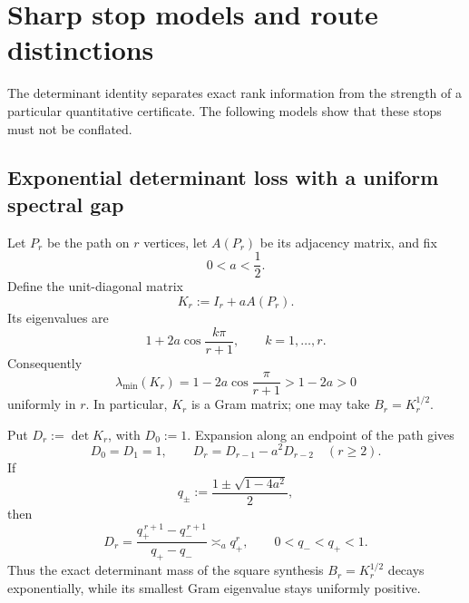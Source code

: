 \section{Sharp stop models and route distinctions}
\label{sec:tpc67-countermodels}

The determinant identity separates exact rank information from the
strength of a particular quantitative certificate.  The following
models show that these stops must not be conflated.

\subsection{Exponential determinant loss with a uniform spectral gap}

\begin{example}
\label{ex:tpc67-path-determinant-decay}
Let \(P_r\) be the path on \(r\) vertices, let \(A(P_r)\) be its adjacency
matrix, and fix
\[
 0<a<\frac12.
\]
Define the unit-diagonal matrix
\begin{equation}
 K_r:=I_r+aA(P_r).
 \label{eq:tpc67-path-Gram}
\end{equation}
Its eigenvalues are
\begin{equation}
 1+2a\cos\frac{k\pi}{r+1},
 \qquad k=1,\ldots,r.
 \label{eq:tpc67-path-spectrum}
\end{equation}
Consequently
\begin{equation}
 \lambda_{\min}(K_r)
 =
 1-2a\cos\frac{\pi}{r+1}
 >
 1-2a>0
 \label{eq:tpc67-path-uniform-gap}
\end{equation}
uniformly in \(r\).  In particular, \(K_r\) is a Gram matrix; one may
take \(B_r=K_r^{1/2}\).

Put \(D_r:=\det K_r\), with \(D_0:=1\).  Expansion along an endpoint of
the path gives
\begin{equation}
 D_0=D_1=1,
 \qquad
 D_r=D_{r-1}-a^2D_{r-2}
 \quad(r\ge2).
 \label{eq:tpc67-path-determinant-recurrence}
\end{equation}
If
\begin{equation}
 q_\pm:=\frac{1\pm\sqrt{1-4a^2}}2,
 \label{eq:tpc67-path-characteristic-roots}
\end{equation}
then
\begin{equation}
 D_r
 =
 \frac{q_+^{\,r+1}-q_-^{\,r+1}}{q_+-q_-}
 \asymp_a q_+^r,
 \qquad
 0<q_-<q_+<1.
 \label{eq:tpc67-path-determinant-decay}
\end{equation}
Thus the exact determinant mass of the square synthesis
\(B_r=K_r^{1/2}\) decays exponentially, while its smallest Gram
eigenvalue stays uniformly positive.
\end{example}

